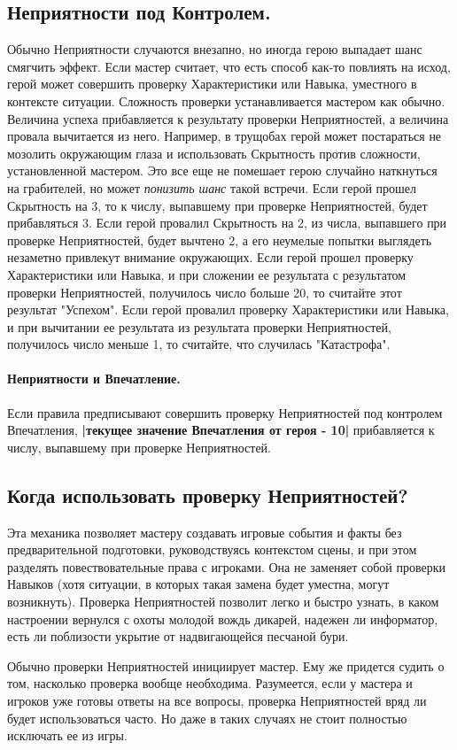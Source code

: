 \subsection{Неприятности под Контролем.}
Обычно Неприятности случаются внезапно, но иногда герою выпадает шанс смягчить эффект. Если мастер считает, что есть способ как-то повлиять на исход, герой может совершить проверку Характеристики или Навыка, уместного в контексте ситуации. Сложность проверки устанавливается мастером как обычно. Величина успеха прибавляется к результату проверки Неприятностей, а величина провала вычитается из него.
\newline Например, в трущобах герой может постараться не мозолить окружающим глаза и использовать Скрытность против сложности, установленной мастером. Это все еще не помешает герою случайно наткнуться на грабителей, но может \textit{понизить шанс} такой встречи. Если герой прошел Скрытность на 3, то к числу, выпавшему при проверке Неприятностей, будет прибавляться 3. Если герой провалил Скрытность на 2, из числа, выпавшего при проверке Неприятностей, будет вычтено 2, а его неумелые попытки выглядеть незаметно привлекут внимание окружающих.
\newline Если герой прошел проверку Характеристики или Навыка, и при сложении ее результата с результатом проверки Неприятностей, получилось число больше 20, то считайте этот результат "Успехом". Если герой провалил проверку Характеристики или Навыка, и при вычитании ее результата из результата проверки Неприятностей, получилось число меньше 1, то считайте, что случилась "Катастрофа".
\paragraph{Неприятности и Впечатление.} Если правила предписывают совершить проверку Неприятностей под контролем Впечатления, \textbf{|текущее значение Впечатления от героя - 10|} прибавляется к числу, выпавшему при проверке Неприятностей.

\subsection{Когда использовать проверку Неприятностей?}
Эта механика позволяет мастеру создавать игровые события и факты без предварительной подготовки, руководствуясь контекстом сцены, и при этом разделять повествовательные права с игроками. Она не заменяет собой проверки Навыков (хотя ситуации, в которых такая замена будет уместна, могут возникнуть). Проверка Неприятностей позволит легко и быстро узнать, в каком настроении вернулся с охоты молодой вождь дикарей, надежен ли информатор, есть ли поблизости укрытие от надвигающейся песчаной бури. 

\begin{tcolorbox}
    Обычно проверки Неприятностей инициирует мастер. Ему же придется судить о том, насколько проверка вообще необходима. Разумеется, если у мастера и игроков уже готовы ответы на все вопросы, проверка Неприятностей вряд ли будет использоваться часто. Но даже в таких случаях не стоит полностью исключать ее из игры.
\end{tcolorbox}
